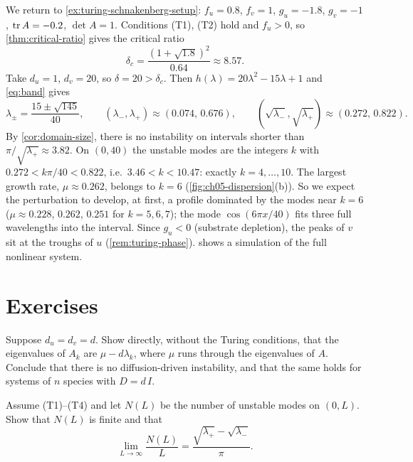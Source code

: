 \begin{example}\label{ex:schnakenberg-turing}
We return to \cref{ex:turing-schnakenberg-setup}: $f_u=0.8$, $f_v=1$, $g_u=-1.8$,
$g_v=-1$, $\operatorname{tr} A=-0.2$, $\det A=1$. Conditions (T1), (T2) hold and $f_u>0$, so
\cref{thm:critical-ratio} gives the critical ratio
\begin{equation*}
  \delta_c = \frac{(1+\sqrt{1.8})^2}{0.64}\approx 8.57 .
\end{equation*}
Take $d_u=1$, $d_v=20$, so $\delta=20>\delta_c$. Then $h(\lambda)=20\lambda^2-15\lambda+1$
and \eqref{eq:band} gives
\begin{equation*}
  \lambda_\pm = \frac{15\pm\sqrt{145}}{40},\qquad
  (\lambda_-,\lambda_+)\approx(0.074,\,0.676),\qquad
  (\sqrt{\lambda_-},\sqrt{\lambda_+})\approx(0.272,\,0.822).
\end{equation*}
By \cref{cor:domain-size}, there is no instability on intervals shorter than
$\pi/\sqrt{\lambda_+}\approx 3.82$. On $(0,40)$ the unstable modes are the integers
$k$ with $0.272<k\pi/40<0.822$, i.e.\ $3.46<k<10.47$: exactly $k=4,\dots,10$. The
largest growth rate, $\mu\approx0.262$, belongs to $k=6$ (\cref{fig:ch05-dispersion}(b)).
So we expect the perturbation to develop, at first, a profile dominated by the
modes near $k=6$ ($\mu\approx0.228$, $0.262$, $0.251$ for $k=5,6,7$); the mode
$\cos(6\pi x/40)$ fits three full wavelengths into the interval. Since $g_u<0$ (substrate depletion), the
peaks of $v$ sit at the troughs of $u$ (\cref{rem:turing-phase}).
 shows a simulation of the full nonlinear system.
\end{example}

\section{Exercises}\label{sec:turing-exercises}

\begin{exercise}\label{exer:turing-equal-diffusion}
Suppose $d_u=d_v=d$. Show directly, without the Turing conditions, that the
eigenvalues of $A_k$ are $\mu-d\lambda_k$, where $\mu$ runs through the eigenvalues
of $A$. Conclude that there is no diffusion-driven instability, and that the same
holds for systems of $n$ species with $D=d\,I$.
\end{exercise}

\begin{exercise}\label{exer:turing-number-of-modes}
Assume (T1)--(T4) and let $N(L)$ be the number of unstable modes on $(0,L)$. Show
that $N(L)$ is finite and that
\begin{equation*}
  \lim_{L\to\infty}\frac{N(L)}{L} = \frac{\sqrt{\lambda_+}-\sqrt{\lambda_-}}{\pi}.
\end{equation*}
\end{exercise}

